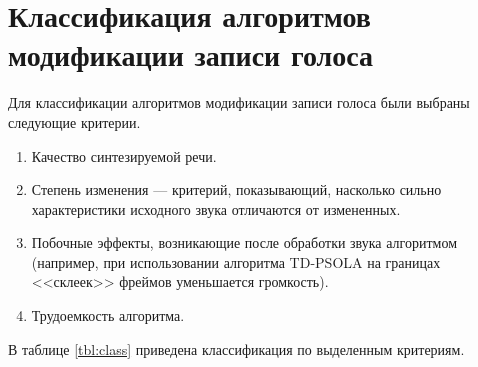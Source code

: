 



\section{Классификация алгоритмов модификации записи голоса}

Для классификации алгоритмов модификации записи голоса были выбраны следующие критерии.
\begin{enumerate}
	\item Качество синтезируемой речи. 
	\item Степень изменения --- критерий, показывающий, насколько сильно характеристики исходного звука отличаются от измененных.
	\item Побочные эффекты, возникающие после обработки звука алгоритмом (например, при использовании алгоритма TD-PSOLA на границах <<склеек>> фреймов уменьшается громкость). 
	\item Трудоемкость алгоритма.
\end{enumerate}

В таблице \ref{tbl:class} приведена классификация по выделенным критериям.

\captionsetup{justification=raggedright, singlelinecheck=false}

